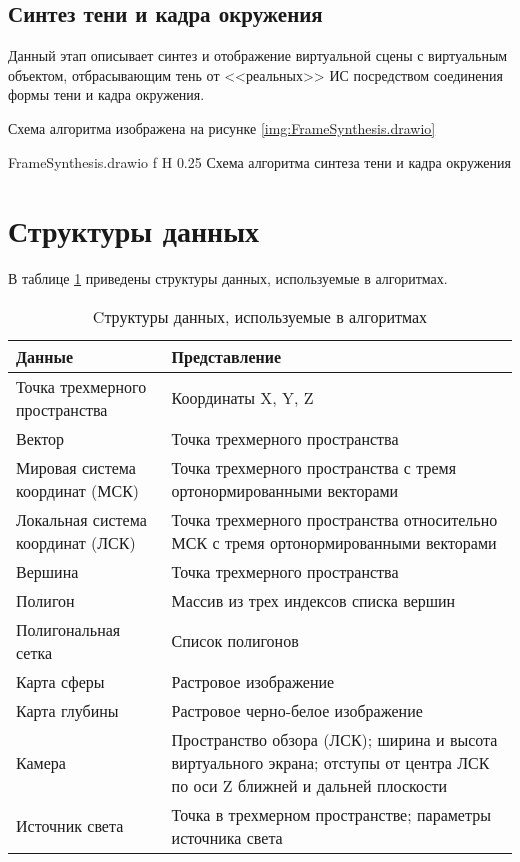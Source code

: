 \subsection{Синтез тени и кадра окружения}

Данный этап описывает синтез и отображение виртуальной сцены с виртуальным объектом, отбрасывающим тень от <<реальных>> ИС посредством соединения формы тени и кадра окружения.

Схема алгоритма изображена на рисунке \ref{img:FrameSynthesis.drawio}

{FrameSynthesis.drawio}
{f}
{H}
{0.25\textwidth}
{Схема алгоритма синтеза тени и кадра окружения}

\section{Структуры данных}

В таблице \ref{DataStructures} приведены структуры данных, используемые в алгоритмах.

\begin{table}[H]
	\caption{Cтруктуры данных, используемые в алгоритмах}
	\label{DataStructures}
	\begin{center}
		\begin{tabular}{| p{4 cm} | p{11 cm} |} 
			\hline
			Данные & Представление \\
			\hline
			Точка трехмерного пространства & Координаты X, Y, Z \\
			\hline
			Вектор & Точка трехмерного пространства  \\
			\hline
			Мировая система координат (МСК) & Точка трехмерного пространства с тремя ортонормированными векторами \\
			\hline
			Локальная система координат (ЛСК) & Точка трехмерного пространства относительно МСК с тремя ортонормированными векторами \\
			\hline
			Вершина & Точка трехмерного пространства \\
			\hline
			Полигон & Массив из трех индексов списка вершин \\
			\hline
			Полигональная сетка & Список полигонов \\
			\hline
			Карта сферы & Растровое изображение \\
			\hline
			Карта глубины & Растровое черно-белое изображение \\
			\hline
			Камера & Пространство обзора (ЛСК); ширина и высота виртуального экрана; отступы от центра ЛСК по оси Z ближней и дальней плоскости \\
			\hline
			Источник света & Точка в трехмерном пространстве; параметры источника света \\
			\hline
		\end{tabular}
	\end{center}
\end{table}

